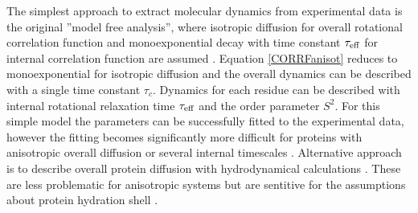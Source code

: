 \documentclass[pre,aps,floatfix,authordate1-4,twocolumn]{revtex4-1}
\begin{document}
The simplest approach to extract molecular dynamics from experimental
data is the original ''model free analysis'', where
isotropic diffusion for overall rotational correlation function and
monoexponential decay with time constant $\tau_{\rm eff}$ for internal correlation
function are assumed \cite{Lipari82}. Equation \ref{CORRFanisot} reduces to monoexponential
for isotropic diffusion and the overall dynamics can be described with a single
time constant $\tau_c$. Dynamics for each residue can be described with internal rotational relaxation 
time $\tau_{\rm eff}$ and the order parameter $S^2$. For this simple model
the parameters can be successfully fitted to the experimental data,
however the fitting becomes significantly more difficult for proteins 
with anisotropic overall diffusion or several internal timescales \cite{dosset00,luginbuhl97,jarymowycz06}.
Alternative approach is to describe overall protein diffusion with hydrodynamical
calculations \cite{torre00}. These are less problematic for anisotropic systems but
are sentitive for the assumptions about protein hydration shell \cite{torre00}.





\end{document}
